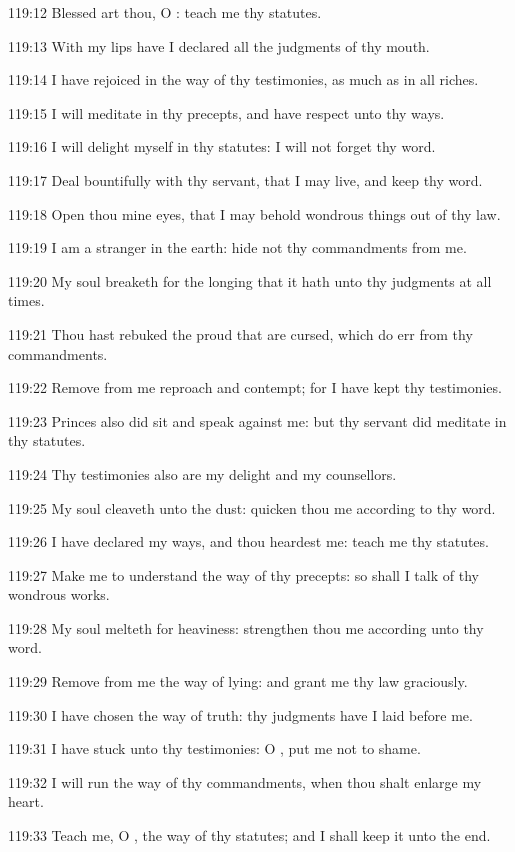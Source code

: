 119:12 Blessed art thou, O \LORD: teach me thy statutes.

119:13 With my lips have I declared all the judgments of thy mouth.

119:14 I have rejoiced in the way of thy testimonies, as much as in
all riches.

119:15 I will meditate in thy precepts, and have respect unto thy
ways.

119:16 I will delight myself in thy statutes: I will not forget thy
word.

119:17 Deal bountifully with thy servant, that I may live, and keep
thy word.

119:18 Open thou mine eyes, that I may behold wondrous things out of
thy law.

119:19 I am a stranger in the earth: hide not thy commandments from
me.

119:20 My soul breaketh for the longing that it hath unto thy
judgments at all times.

119:21 Thou hast rebuked the proud that are cursed, which do err from
thy commandments.

119:22 Remove from me reproach and contempt; for I have kept thy
testimonies.

119:23 Princes also did sit and speak against me: but thy servant did
meditate in thy statutes.

119:24 Thy testimonies also are my delight and my counsellors.

119:25 My soul cleaveth unto the dust: quicken thou me according to
thy word.

119:26 I have declared my ways, and thou heardest me: teach me thy
statutes.

119:27 Make me to understand the way of thy precepts: so shall I talk
of thy wondrous works.

119:28 My soul melteth for heaviness: strengthen thou me according
unto thy word.

119:29 Remove from me the way of lying: and grant me thy law
graciously.

119:30 I have chosen the way of truth: thy judgments have I laid
before me.

119:31 I have stuck unto thy testimonies: O \LORD, put me not to shame.

119:32 I will run the way of thy commandments, when thou shalt enlarge
my heart.

119:33 Teach me, O \LORD, the way of thy statutes; and I shall keep it
unto the end.

